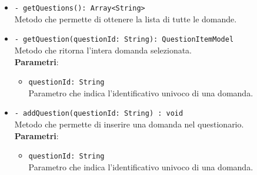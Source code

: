 \begin{itemize}
\begin{itemize}
			\item \texttt{- getQuestions(): Array<String>} \\
			Metodo che permette di ottenere la lista di tutte le domande.
			
			\item \texttt{- getQuestion(questionId: String): QuestionItemModel} \\
			Metodo che ritorna l'intera domanda selezionata. \\
			\textbf{Parametri}:
			\begin{itemize}
				\item \texttt{questionId: String}\\
				Parametro che indica l'identificativo univoco di una domanda.
			\end{itemize}
			\item \texttt{- addQuestion(questionId: String) : void} \\
			Metodo che permette di inserire una domanda nel questionario. \\
			\textbf{Parametri}:
			\begin{itemize}
				\item \texttt{questionId: String}\\
				Parametro che indica l'identificativo univoco di una domanda.
			\end{itemize}
		\end{itemize}
	\end{itemize}
	
	